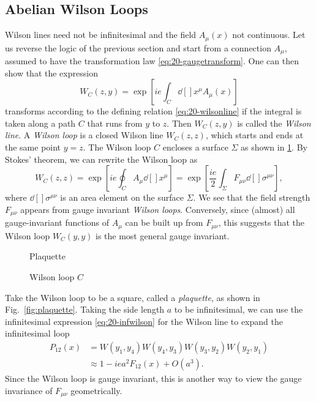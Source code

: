 \subsection{Abelian Wilson Loops}%
\label{sub:abelian_wilson_loops}

Wilson lines need not be infinitesimal and the field $A_{\mu}(x)$ not continuous. Let us reverse the logic of the previous section and start from a connection $A_{\mu}$, assumed to have the transformation law \eqref{eq:20-gaugetransform}. One can then show that the expression
\begin{equation}
  \label{eq:20-line}
  W_C(z, y) = \exp[i e \int_C \dd[]{x^{\mu}} A_{\mu}(x)]
\end{equation}
transforms according to the defining relation \eqref{eq:20-wilsonline} if the integral is taken along a path $C$ that runs from $y$ to $z$. Then $W_C(z, y)$ is called the \emph{Wilson line}.
A \emph{Wilson loop} is a closed Wilson line $W_C(z, z)$, which starts and ends at the same point $y = z$. The Wilson loop $C$ encloses a surface $\Sigma$ as shown in \ref{fig:l20f3}. By Stokes' theorem, we can rewrite the Wilson loop as
\begin{equation}
  \label{eq:20-loop}
  W_C(z, z) = \exp[i e \oint_{C} A_{\mu} \dd[]{x^{\mu}}] = \exp[\frac{i e}{2} \int_\Sigma F_{\mu\nu} \dd[]{\sigma^{\mu\nu}}],
\end{equation}
where $\dd[]{\sigma^{\mu\nu}}$ is an area element on the surface $\Sigma$.  We see that the field strength $F_{\mu\nu}$ appears from gauge invariant \emph{Wilson loops}.
Conversely, since (almost) all gauge-invariant functions of $A_{\mu}$ can be built up from $F_{\mu\nu}$, this suggests that the Wilson loop $W_C(y, y)$ is the most general gauge invariant.

\begin{figure}[tbhp]
  \centering
  \begin{minipage}[t]{0.4\columnwidth}
    \centering
    \caption{Plaquette}
    \label{fig:plaquette}
  \end{minipage}%
  \begin{minipage}[t]{0.4\columnwidth}
    \centering
    \caption{Wilson loop $C$}
    \label{fig:l20f3}
  \end{minipage}
\end{figure}
\begin{example}
  Take the Wilson loop to be a square, called a \emph{plaquette}, as shown in Fig.~\ref{fig:plaquette}.
  Taking the side length $a$ to be infinitesimal, we can use the infinitesimal expression \eqref{eq:20-infwilson} for the Wilson line to expand the infinitesimal loop
  \begin{align}
    P_{12} (x) &= W(y_1, y_4) W(y_4, y_3) W(y_3, y_2) W(y_2, y_1) \\
    &\approx 1 - i e a^2 F_{12}(x) + O(a^3).
  \end{align}
  Since the Wilson loop is gauge invariant, this is another way to view the gauge invariance of $F_{\mu\nu}$ geometrically.
\end{example}
